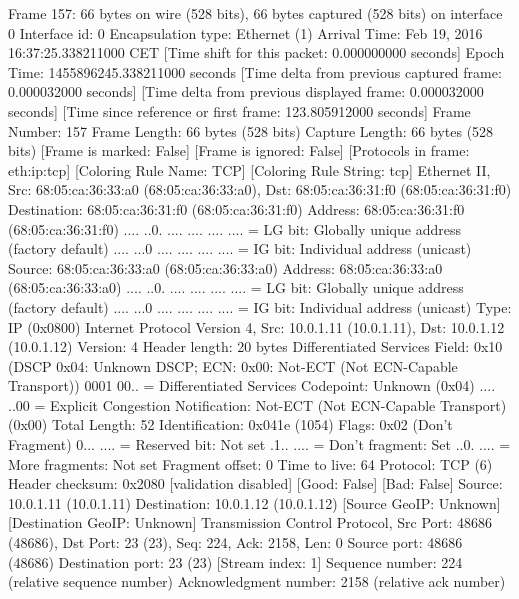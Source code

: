 Frame 157: 66 bytes on wire (528 bits), 66 bytes captured (528 bits) on interface 0
    Interface id: 0
    Encapsulation type: Ethernet (1)
    Arrival Time: Feb 19, 2016 16:37:25.338211000 CET
    [Time shift for this packet: 0.000000000 seconds]
    Epoch Time: 1455896245.338211000 seconds
    [Time delta from previous captured frame: 0.000032000 seconds]
    [Time delta from previous displayed frame: 0.000032000 seconds]
    [Time since reference or first frame: 123.805912000 seconds]
    Frame Number: 157
    Frame Length: 66 bytes (528 bits)
    Capture Length: 66 bytes (528 bits)
    [Frame is marked: False]
    [Frame is ignored: False]
    [Protocols in frame: eth:ip:tcp]
    [Coloring Rule Name: TCP]
    [Coloring Rule String: tcp]
Ethernet II, Src: 68:05:ca:36:33:a0 (68:05:ca:36:33:a0), Dst: 68:05:ca:36:31:f0 (68:05:ca:36:31:f0)
    Destination: 68:05:ca:36:31:f0 (68:05:ca:36:31:f0)
        Address: 68:05:ca:36:31:f0 (68:05:ca:36:31:f0)
        .... ..0. .... .... .... .... = LG bit: Globally unique address (factory default)
        .... ...0 .... .... .... .... = IG bit: Individual address (unicast)
    Source: 68:05:ca:36:33:a0 (68:05:ca:36:33:a0)
        Address: 68:05:ca:36:33:a0 (68:05:ca:36:33:a0)
        .... ..0. .... .... .... .... = LG bit: Globally unique address (factory default)
        .... ...0 .... .... .... .... = IG bit: Individual address (unicast)
    Type: IP (0x0800)
Internet Protocol Version 4, Src: 10.0.1.11 (10.0.1.11), Dst: 10.0.1.12 (10.0.1.12)
    Version: 4
    Header length: 20 bytes
    Differentiated Services Field: 0x10 (DSCP 0x04: Unknown DSCP; ECN: 0x00: Not-ECT (Not ECN-Capable Transport))
        0001 00.. = Differentiated Services Codepoint: Unknown (0x04)
        .... ..00 = Explicit Congestion Notification: Not-ECT (Not ECN-Capable Transport) (0x00)
    Total Length: 52
    Identification: 0x041e (1054)
    Flags: 0x02 (Don't Fragment)
        0... .... = Reserved bit: Not set
        .1.. .... = Don't fragment: Set
        ..0. .... = More fragments: Not set
    Fragment offset: 0
    Time to live: 64
    Protocol: TCP (6)
    Header checksum: 0x2080 [validation disabled]
        [Good: False]
        [Bad: False]
    Source: 10.0.1.11 (10.0.1.11)
    Destination: 10.0.1.12 (10.0.1.12)
    [Source GeoIP: Unknown]
    [Destination GeoIP: Unknown]
Transmission Control Protocol, Src Port: 48686 (48686), Dst Port: 23 (23), Seq: 224, Ack: 2158, Len: 0
    Source port: 48686 (48686)
    Destination port: 23 (23)
    [Stream index: 1]
    Sequence number: 224    (relative sequence number)
    Acknowledgment number: 2158    (relative ack number)
